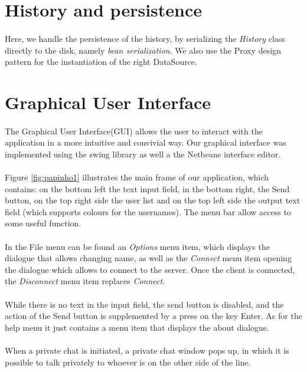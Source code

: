 \documentclass[times, 8pt,twocolumn]{article}
\begin{document}
\section{History and persistence}
\paragraph{} Here, we handle the persistence of the history, by serializing the {\it History} class directly to the disk, namely {\it bean serialization}. We also use the Proxy design pattern for the instantiation of the right DataSource. 
\section{Graphical User Interface}
\paragraph{} The Graphical User Interface(GUI) allows the user to interact with the application in a more intuitive and convivial way. Our graphical interface was implemented using the swing library as well a the Netbeans interface editor.
\paragraph{} Figure \ref{fig:papinho1} illustrates the main frame of our application, which contains: on the bottom left the text input field, in the bottom right, the Send button, on the top right side the user list and on the top left side the output text field (which supports colours for the usernames). The menu bar allow access to some useful function. 
\paragraph{} In the File menu can be found an {\it Options} menu item, which displays the dialogue that allows changing name, as well as the {\it Connect} menu item opening the dialogue which allows to connect to the server. Once the client is connected, the {\it Disconnect} menu item replaces {\it Connect}. 
\paragraph{} While there is no text in the input field, the send button is disabled, and the action of the Send button is supplemented by a press on the key Enter. As for the help menu it just contains a menu item that displays the about dialogue. 
\paragraph{} When a private chat is initiated, a private chat window pops up, in which it is possible to talk privately to whoever is on the other side of the line.
\end{document}
